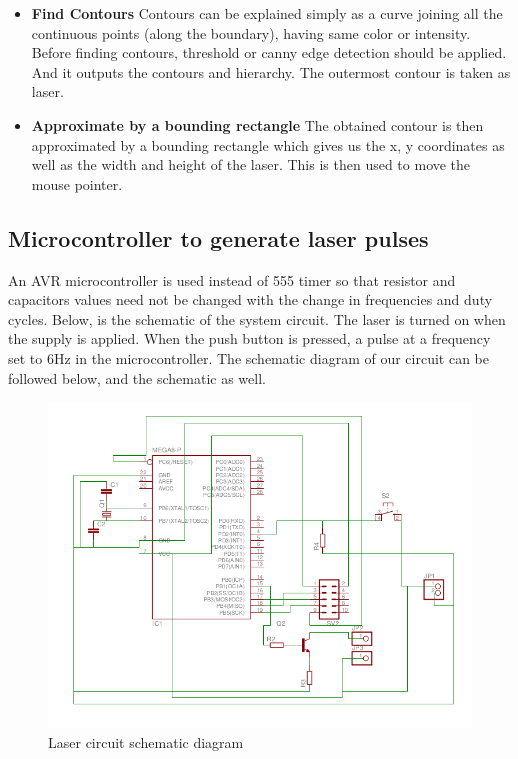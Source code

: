 \documentclass[12pt, a4paper]{article}
\begin{document}
{\begin{itemize}
\item {\textbf{Find Contours}}
Contours can be explained simply as a curve joining all the continuous points (along the boundary), having same color or intensity. Before finding contours, threshold or canny edge detection should be applied. And it outputs the contours and hierarchy.
The outermost contour is taken as laser.

\item{\textbf{Approximate by a bounding rectangle}}
The obtained contour is then approximated by a bounding rectangle which gives us the x, y coordinates as well as the width and height of the laser. This is then used to move the mouse pointer. 

\end{itemize}
		
\subsection{Microcontroller to generate laser pulses}

	An AVR microcontroller is used instead of 555 timer so that resistor and capacitors values need not be changed with the change in frequencies and duty cycles. Below, is the schematic of the system circuit. The laser is turned on when the supply is applied. When the push button is pressed, a pulse at a frequency set to 6Hz in the microcontroller. The schematic diagram of our circuit can be followed below, and the schematic as well.
	

\begin{figure}[htp]
	\centering
	\includegraphics[scale=0.55]{schematic.png}
	\caption{Laser circuit schematic diagram}
	\label{}
\end{figure}

}
\end{document}
